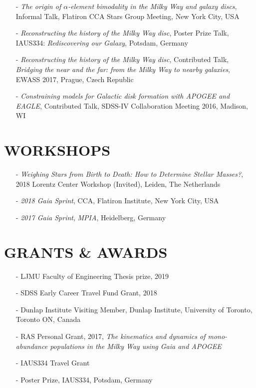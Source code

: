 \documentclass[margin]{res}
\begin{document}
\begin{resume}
\begin{itemize}
\item[-] \emph{The origin of $\alpha$-element bimodality in the Milky Way and galaxy discs}, Informal Talk, Flatiron CCA Stars Group Meeting, New York City, USA
\item[-] \emph{Reconstructing the history of the Milky Way disc}, Poster Prize Talk, IAUS334: \emph{Rediscovering our Galaxy}, Potsdam, Germany
\item[-] \emph{Reconstructing the history of the Milky Way disc}, Contributed Talk, \emph{Bridging the near and the far: from the Milky Way to nearby galaxies}, EWASS 2017, Prague, Czech Republic
\item[-] \emph{Constraining models for Galactic disk formation with APOGEE and EAGLE}, Contributed Talk, SDSS-IV Collaboration Meeting 2016, Madison, WI
\end{itemize}

\section{WORKSHOPS}
\begin{itemize}
\item[-] \emph{Weighing Stars from Birth to Death: How to Determine Stellar Masses?}, 2018 Lorentz Center Workshop (Invited), Leiden, The Netherlands
\item[-] \emph{2018 \emph{Gaia} Sprint}, CCA, Flatiron Institute, New York City, USA
\item[-] \emph{2017 \emph{Gaia} Sprint}, \emph{MPIA}, Heidelberg, Germany
\end{itemize}

\section{GRANTS \& AWARDS}
\begin{itemize}
\item[-] LJMU Faculty of Engineering Thesis prize, 2019 
\item[-] SDSS Early Career Travel Fund Grant, 2018
\item[-] Dunlap Institute Visiting Member, Dunlap Institute, University of Toronto, Toronto ON, Canada
\item[-] RAS Personal Grant, 2017, \emph{The kinematics and dynamics of mono-abundance populations in the Milky Way using Gaia and APOGEE}
\item[-] IAUS334 Travel Grant
\item[-] Poster Prize, IAUS334, Potsdam, Germany
\end{itemize}



\end{resume}
\end{document}
